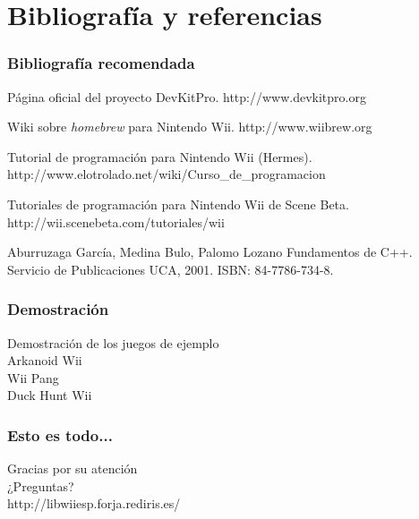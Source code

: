 

\section{Bibliografía y referencias}

\begin{frame}
\frametitle{Bibliografía recomendada}
\begin{thebibliography}{5}
\beamertemplatearticlebibitems
	Página oficial del proyecto DevKitPro.
	\newblock http://www.devkitpro.org
	
	Wiki sobre \textit{homebrew} para Nintendo Wii.
	\newblock http://www.wiibrew.org
	
	Tutorial de programación para Nintendo Wii (Hermes).
	\newblock http://www.elotrolado.net/wiki/Curso\_de\_programacion

	Tutoriales de programación para Nintendo Wii de Scene Beta.
	\newblock http://wii.scenebeta.com/tutoriales/wii
	 
\beamertemplatebookbibitems
	Aburruzaga García, Medina Bulo, Palomo Lozano
	\newblock Fundamentos de C++. Servicio de Publicaciones UCA, 2001. ISBN: 84-7786-734-8.
\end{thebibliography}
\end{frame}

\begin{frame}
\frametitle{Demostración}
\begin{center}
	{\LARGE Demostración de los juegos de ejemplo}\\
	\bigskip
	{\large Arkanoid Wii}\\
	\medskip
	{\large Wii Pang}\\
	\medskip
	{\large Duck Hunt Wii}
\end{center}
\end{frame}

\begin{frame}
\frametitle{Esto es todo...}
\begin{center}
	{\LARGE Gracias por su atención}\\
	\medskip
	{\large ¿Preguntas?}\\
	\bigskip
	http://libwiiesp.forja.rediris.es/
\end{center}
\end{frame}

